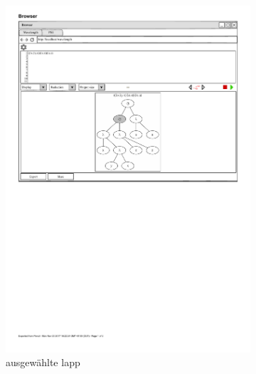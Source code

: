 \documentclass[parskip=full,11pt,twoside]{scrartcl}
\begin{document}
\begin{figure}[H]
	\begin{subfigure}{0.5\textwidth}
		\centering
		\includegraphics{img/displayTree2}
		\caption{ausgewählte \gls{lapp}}
	\end{subfigure}
	\begin{subfigure}{0.5\textwidth}
		\centering

\end{subfigure}
\end{figure}
\end{document}
